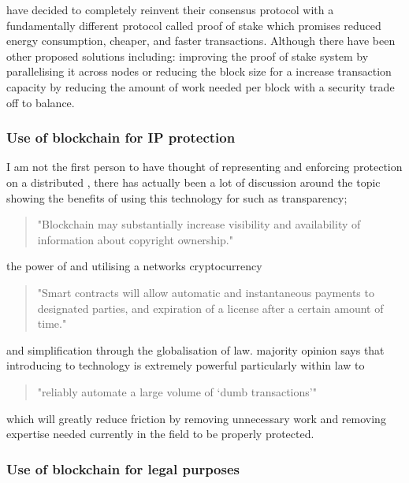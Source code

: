  have decided to completely reinvent their consensus protocol with a fundamentally different protocol called proof of stake which promises reduced energy consumption, cheaper, and faster transactions\cite{PoS}. Although there have been other proposed solutions including: improving the proof of stake system by parallelising it across nodes\cite{fi12080125} or reducing the block size for a increase transaction capacity by reducing the amount of work needed per block with a security trade off to balance\cite{kiayias2015speed}.

\subsubsection{Use of blockchain for IP protection}

I am not the first person to have thought of representing and enforcing  protection on a distributed , there has actually been a lot of discussion around the topic showing the benefits of using this technology for  such as transparency; \begin{quote} "Blockchain may substantially increase visibility and availability of information about copyright ownership." \cite{Copyright_in_the_blockchain_era} \end{quote} the power of  and utilising a networks cryptocurrency \begin{quote} "Smart contracts will allow automatic and instantaneous payments to designated parties, and expiration of a license after a certain amount of time." \cite{Copyright_in_the_blockchain_era} \end{quote} and simplification through the globalisation of  law. majority opinion says that introducing  to  technology is extremely powerful particularly within  law to \begin{quote}"reliably automate a large volume of ‘dumb transactions’" \cite{missing_link_in_copyright_licensing}\end{quote} which will greatly reduce friction by removing unnecessary work and removing expertise needed currently in the field to be properly protected.

\subsubsection{Use of blockchain for legal purposes}

